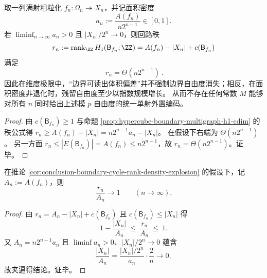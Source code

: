 \begin{corollary}[面积密度非退化时回路秩的指数尺度]\label{cor:conclusion-boundary-cycle-rank-density-explosion}
取一列满射粗粒化 \(f_n:\Omega_n\twoheadrightarrow X_n\)，并记面积密度
\[
a_n:=\frac{A(f_n)}{n2^{n-1}}\in[0,1].
\]
若 \(\liminf_{n\to\infty}a_n>0\) 且 \(|X_n|/2^n\to 0\)，则回路秩
\[
r_n:=\operatorname{rank}_{\ZZ}H_1(\mathsf B_{f_n};\ZZ)=A(f_n)-|X_n|+c(\mathsf B_{f_n})
\]
满足
\[
\boxed{\ r_n=\Theta(n2^{n-1})\ }.
\]
因此在维度极限中，“边界可读出体积偏差”并不强制边界自由度消失；相反，在面积密度非退化时，残留自由度至少以指数规模增长。
从而不存在任何常数 \(M\) 能够对所有 \(n\) 同时给出上述模 \(p\) 自由度的统一单射外置编码。
\end{corollary}
\begin{proof}
由 \(c(\mathsf B_{f_n})\ge 1\) 与命题 \ref{prop:hypercube-boundary-multigraph-h1-cdim} 的秩公式得
\(
r_n\ge A(f_n)-|X_n|
=n2^{n-1}a_n-|X_n|
\)。
在假设下右端为 \(\Theta(n2^{n-1})\)。
另一方面 \(r_n\le |E(\mathsf B_{f_n})|=A(f_n)\le n2^{n-1}\)，故 \(r_n=\Theta(n2^{n-1})\)。证毕。
\end{proof}

\begin{corollary}[面积密度非退化下的回路秩饱和]\label{cor:conclusion-boundary-cycle-rank-saturation}
在推论 \ref{cor:conclusion-boundary-cycle-rank-density-explosion} 的假设下，记 \(A_n:=A(f_n)\)，则
\[
\frac{r_n}{A_n}\longrightarrow 1\qquad(n\to\infty).
\]
\end{corollary}
\begin{proof}
由 \(r_n=A_n-|X_n|+c(\mathsf B_{f_n})\) 且 \(c(\mathsf B_{f_n})\le |X_n|\) 得
\[
1-\frac{|X_n|}{A_n}\ \le\ \frac{r_n}{A_n}\ \le\ 1.
\]
又 \(A_n=n2^{n-1}a_n\) 且 \(\liminf a_n>0\)、\(|X_n|/2^n\to 0\) 蕴含
\[
\frac{|X_n|}{A_n}
=\frac{|X_n|/2^n}{a_n}\cdot\frac{2}{n}\longrightarrow 0,
\]
故夹逼得结论。证毕。
\end{proof}

\endinput

